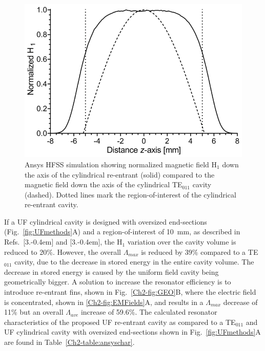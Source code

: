 \begin{figure}[htb]\centering
 \includegraphics{Kapitel/Ch2-Images/02-TE01UProfile.eps}
 \caption[Ansys HFSS simulation of normalized H$_1$ field.]{Ansys HFSS simulation showing normalized magnetic field H$_1$ down the axis of the cylindrical re-entrant \cylTE{} (solid) compared to the magnetic field down the axis of the cylindrical TE$_{\text{011}}$ cavity (dashed). Dotted lines mark the region-of-interest of the cylindrical re-entrant \cylTE{} cavity. }
 \label{Ch2-fig:normb1}
\end{figure}

If a UF cylindrical \cylTE{} cavity is designed with oversized end-sections (Fig.~\ref{fig:UFmethods}A) and a region-of-interest of 10~mm, as described in Refs.~[3.\kern-0.4em] and [3.\kern-0.4em], the H$_1$ variation over the cavity volume is reduced to 20\%. However, the overall $\Lambda_{max}$ is reduced by 39\% compared to a TE$_{011}$ cavity, due to the decrease in stored energy in the entire cavity volume. The decrease in stored energy is caused by the uniform field cavity being geometrically bigger. A solution to increase the resonator efficiency is to introduce re-entrant fins, shown in Fig.~\ref{Ch2-fig:GEO}B, where the electric field is concentrated, shown in \ref{Ch2-fig:EMFields}A, and results in a $\Lambda_{max}$ decrease of 11\% but an overall $\Lambda_{ave}$ increase of 59.6\%. The calculated resonator characteristics of the proposed UF re-entrant \cylTE{} cavity as compared to a TE$_{011}$ and UF cylindrical \cylTE{} cavity with oversized end-sections shown in Fig.~\ref{fig:UFmethods}A are found in Table~\ref{Ch2-table:ansyschar}.

